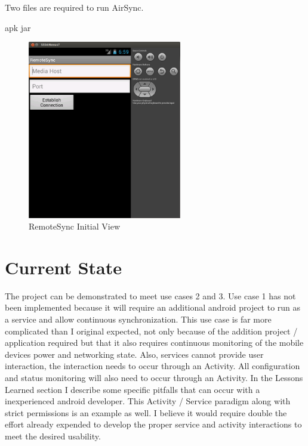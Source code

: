 \documentclass[12pt]{article}
\begin{document}
Two files are required to run AirSync. 

apk
jar

\begin{figure}[h]
\includegraphics[width=0.6\textwidth]{android-main.png}
\caption{RemoteSync Initial View}
\end{figure}

\section{Current State}
The project can be demonstrated to meet use cases 2 and 3.  Use case 1 has not been implemented because it will require an additional android project to run as a service and allow continuous synchronization.  This use case is far more complicated than I original expected, not only because of the addition project / application required but that it also requires continuous monitoring of the mobile devices power and networking state. Also, services cannot provide user interaction, the interaction needs to occur through an Activity. All configuration and status monitoring will also need to occur through an Activity.  In the Lessons Learned section I describe some specific pitfalls that can occur with a inexperienced android developer. This Activity / Service paradigm along with strict permissions is an example as well. I believe it would require double the effort already expended to develop the proper service and activity interactions to meet the desired usability.
\end{document}
